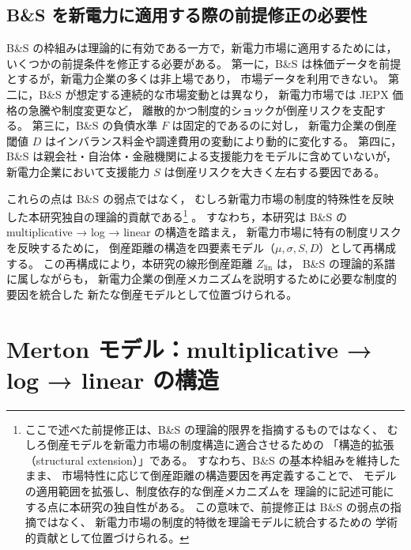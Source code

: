 
\subsection{B\&S を新電力に適用する際の前提修正の必要性}

B\&S の枠組みは理論的に有効である一方で，新電力市場に適用するためには，
いくつかの前提条件を修正する必要がある。
第一に，B\&S は株価データを前提とするが，新電力企業の多くは非上場であり，
市場データを利用できない。
第二に，B\&S が想定する連続的な市場変動とは異なり，
新電力市場では JEPX 価格の急騰や制度変更など，
離散的かつ制度的ショックが倒産リスクを支配する。
第三に，B\&S の負債水準 $F$ は固定的であるのに対し，
新電力企業の倒産閾値 $D$ はインバランス料金や調達費用の変動により動的に変化する。
第四に，B\&S は親会社・自治体・金融機関による支援能力をモデルに含めていないが，
新電力企業において支援能力 $S$ は倒産リスクを大きく左右する要因である。

これらの点は B\&S の弱点ではなく，
むしろ新電力市場の制度的特殊性を反映した本研究独自の理論的貢献である\footnote{
ここで述べた前提修正は、B\&S の理論的限界を指摘するものではなく、
むしろ倒産モデルを新電力市場の制度構造に適合させるための
「構造的拡張（structural extension）」である。
すなわち、B\&S の基本枠組みを維持したまま、
市場特性に応じて倒産距離の構造要因を再定義することで、
モデルの適用範囲を拡張し、制度依存的な倒産メカニズムを
理論的に記述可能にする点に本研究の独自性がある。
この意味で、前提修正は B\&S の弱点の指摘ではなく、
新電力市場の制度的特徴を理論モデルに統合するための
学術的貢献として位置づけられる。
}
。
すなわち，本研究は B\&S の multiplicative → log → linear の構造を踏まえ，
新電力市場に特有の制度リスクを反映するために，
倒産距離の構造を四要素モデル（$\mu, \sigma, S, D$）として再構成する。
この再構成により，本研究の線形倒産距離 $Z_{\text{lin}}$ は，
B\&S の理論的系譜に属しながらも，
新電力企業の倒産メカニズムを説明するために必要な制度的要因を統合した
新たな倒産モデルとして位置づけられる。

\section{Merton モデル：multiplicative → log → linear の構造}

